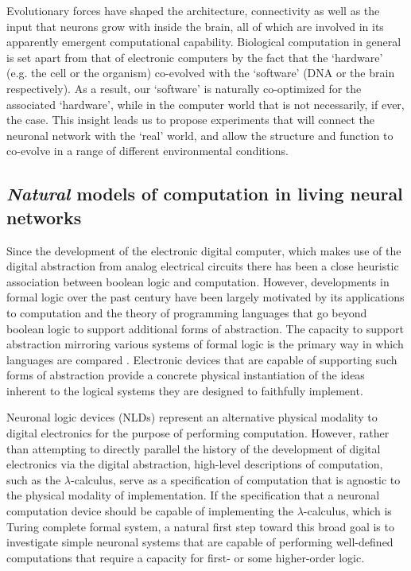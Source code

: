 Evolutionary forces have shaped the architecture, connectivity as well as the input that neurons grow with inside the brain, all of which are involved in its apparently emergent computational capability. Biological computation in general is set apart from that of electronic computers by the fact that the `hardware' (e.g. the cell or the organism) co-evolved with the `software' (DNA or the brain respectively). As a result, our `software' is naturally co-optimized for the associated `hardware', while in the computer world that is not necessarily, if ever, the case. This insight leads us to propose experiments that will connect the neuronal network with the `real' world, and  allow the structure and function to co-evolve in a range of different environmental conditions.

\subsection{\emph{Natural} models of computation in living neural networks}

Since the development of the electronic digital computer, which makes
use of the digital abstraction \cite{Ward1989} from analog electrical circuits
there has been a close heuristic association between boolean logic and
computation. However, developments in formal logic over the past century
have been largely motivated by its applications to computation and the
theory of programming languages that go beyond boolean logic to support additional forms of abstraction. The capacity to support abstraction mirroring various systems of
formal logic is the primary way in which languages are compared \cite{Abelson1996}. Electronic devices that are capable
of supporting such forms of abstraction provide a concrete physical
instantiation of the ideas inherent to the logical systems they are
designed to faithfully implement.

Neuronal logic devices (NLDs) represent an alternative physical modality
to digital electronics for the purpose of performing computation.
However, rather than attempting to directly parallel the history of the
development of digital electronics via the digital abstraction,
high-level descriptions of computation, such as the
$\lambda$-calculus, serve as a specification
of computation that is agnostic to the physical modality of
implementation. If the specification that a neuronal computation device
should be capable of implementing the
$\lambda$-calculus, which is Turing complete formal system, a natural first step
toward this broad goal is to investigate simple neuronal systems that
are capable of performing well-defined computations that require a
capacity for first- or some higher-order logic.

